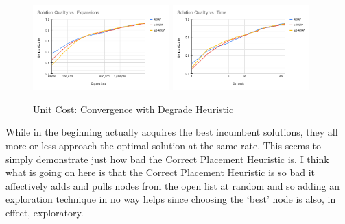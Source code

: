 \begin{figure}
    \includegraphics[width=0.47\textwidth]{media/correct-Solution Quality vs. Expansions.png}
    \includegraphics[width=0.47\textwidth]{media/correct-Solution Quality vs. Time.png}
    \caption{Unit Cost: Convergence with Degrade Heuristic} \label{fig:conv-correct}
\end{figure}


While in the beginning \awa actually acquires the best incumbent solutions, they all more or less approach the optimal solution at the same rate. This seems to simply demonstrate just how bad the Correct Placement Heuristic is. I think what is going on here is that the Correct Placement Heuristic is so bad it affectively adds and pulls nodes from the open list at random and so adding an exploration technique in no way helps since choosing the `best' node is also, in effect, exploratory.


